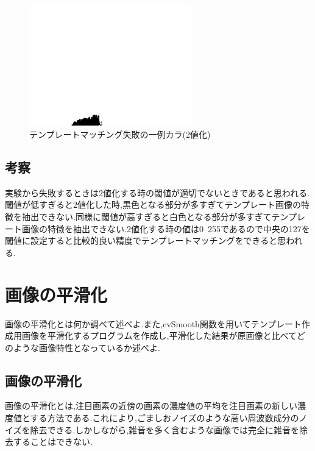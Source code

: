\documentclass{jarticle}
\begin{document}
\begin{figure}[H]
\begin{center}
\includegraphics[width=7.0cm]{cv_kadai02/fail-mono.png}
\caption{テンプレートマッチング失敗の一例カラ(2値化)}
\label{fig:cvkadai02-fail-mono}
\end{center}
\end{figure}

\subsection{考察}
実験から失敗するときは2値化する時の閾値が適切でないときであると思われる.閾値が低すぎると2値化した時,黒色となる部分が多すぎてテンプレート画像の特徴を抽出できない.同様に閾値が高すぎると白色となる部分が多すぎてテンプレート画像の特徴を抽出できない.2値化する時の値は0~255であるので中央の127を閾値に設定すると比較的良い精度でテンプレートマッチングをできると思われる.

\section{画像の平滑化}
画像の平滑化とは何か調べて述べよ.また,cvSmooth関数を用いてテンプレート作成用画像を平滑化するプログラムを作成し,平滑化した結果が原画像と比べてどのような画像特性となっているか述べよ.

\subsection{画像の平滑化}
画像の平滑化とは,注目画素の近傍の画素の濃度値の平均を注目画素の新しい濃度値とする方法である.これにより,ごましおノイズのような高い周波数成分のノイズを除去できる.しかしながら,雑音を多く含むような画像では完全に雑音を除去することはできない.
\end{document}
